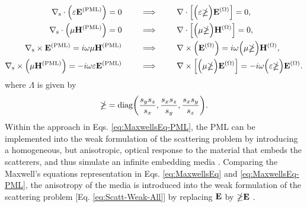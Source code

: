     \begin{subequations}
        \label{eq:MaxwellsEq-PML}
    \begin{align}
        \nabla_\text{s} \cdot \qty(\varepsilon \vb{E}^\text{(PML)})  = 0
            \qquad &\implies\qquad
            \nabla \cdot \Big[\Big(\varepsilon \mathbb{\Lambda}\Big)\vb{E}^{(\Omega)}\Big] =  0,
             \\
        \nabla_\text{s}  \cdot    \Big(\mu \vb{H}^\text{(PML)}\Big) = 0
            \qquad &\implies\qquad
            \nabla \cdot \Big[\Big(\mu \mathbb{\Lambda} \Big)\vb{H}^{(\Omega)}\Big] =  0,
            \\
        \nabla_\text{s} \times \vb{E}^\text{(PML)}  = i\omega \mu \vb{H}^\text{(PML)}
            \qquad &\implies\qquad
            \nabla \times \Big(\vb{E}^{(\Omega)}\Big) = i\omega\Big( \mu\mathbb{\Lambda}\Big) \vb{H}^{(\Omega)},
            \\
        \nabla_\text{s}  \times\Big(\mu \vb{H}^\text{(PML)} \Big) =   - i\omega \varepsilon \vb{E}^\text{(PML)}
            \qquad &\implies\qquad
            \nabla \times \Big[\Big(\mu \mathbb{\Lambda}\Big) \vb{E}^{(\Omega)}\Big] =  -i\omega\Big(\varepsilon\mathbb{\Lambda}\Big)\vb{E}^{(\Omega)}.
    \end{align}
    \end{subequations}
    where $\mathbb{\Lambda}$ is given by
    \begin{align}
        \mathbb{\Lambda} = \text{diag}\qty(\frac{s_y s_z}{s_x},\frac{s_x s_z}{s_y},\frac{s_x s_y}{s_z}).
    \end{align}
    Within the approach in Eqs. \eqref{eq:MaxwellsEq-PML}, the PML can be implemented into the weak formulation of the scattering problem  by introducing a homogeneous, but anisotropic, optical response to the material that embeds the scatterers, and thus simulate an infinite embedding media \cite{chew_complex_1997,bondeson_computational_2005,jin_theory_2010}. Comparing the Maxwell's equations representation in Eqs. \eqref{eq:MaxwellsEq} and \eqref{eq:MaxwellsEq-PML}, the anisotropy of the media is introduced into the weak formulation of the scattering problem [Eq. \eqref{eq:Scatt-Weak-All}] by replacing $\vb{E}$ by $\mathbb{\Lambda}\vb{E}$ \cite{jin_theory_2010}.

